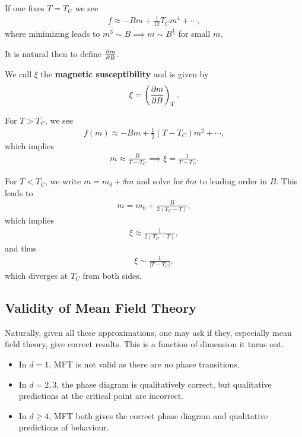 
If one fixes $T = T_C$ we see
\begin{align}
    f \approx - Bm + \frac{1}{12} T_C m^{4} + \cdots
,\end{align}
where minimizing leads to $m^3 \sim B \implies m \sim  B^{\frac{1}{3}}$ for small $m$.

It is natural then to define $\pdv{m}{B}$.

\begin{definition}
    We call $\xi$ the \textbf{magnetic susceptibility} and is given by
    \begin{align}
        \xi = \left( \pdv{m}{B} \right)_T
    .\end{align}
\end{definition}

For $T > T_C$, we see
\begin{align}
    f \left( m \right) \approx - B m + \frac{1}{2} \left( T - T_C \right) m^2 + \cdots
,\end{align}
which implies
\begin{align}
    m \approx \frac{B}{T - T_C} \implies \xi = \frac{1}{T - T_C}
.\end{align}

For $T < T_C$, we write $m = m_0 + \delta m$ and solve for $\delta m$ to leading order in $B$. This leads to
\begin{align}
    m = m_0 + \frac{B}{2 \left( T_C - T \right) }
,\end{align}
which implies
\begin{align}
    \xi \approx \frac{1}{2 \left( T_C - T \right) }
,\end{align}
and thus
\begin{align}
    \xi \sim  \frac{1}{\left| T - T_C \right| }
,\end{align}
which diverges at $T_C$ from both sides.

\subsection{Validity of Mean Field Theory}

Naturally, given all these approximations, one may ask if they, especially mean field theory, give correct results. This is a function of dimension it turns out.
\begin{itemize}
    \item In $d = 1$, MFT is not valid as there are no phase transitions.
    \item In $d = 2,3$, the phase diagram is qualitatively correct, but qualitative predictions at the critical point are incorrect.
    \item In $d \geq 4$, MFT both gives the correct phase diagram and qualitative predictions of behaviour.
\end{itemize}

